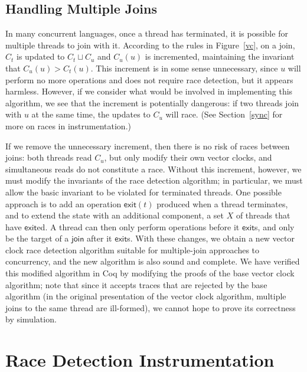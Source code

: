 \documentclass[preprint, 10pt]{sigplanconf}
\begin{document}
\subsection{Handling Multiple Joins}
\label{waits}
In many concurrent languages, once a thread has terminated, it is possible for multiple threads to join with it. According to the rules in Figure~\ref{vc}, on a join, $C_t$ is updated to $C_t \sqcup C_u$ and $C_u(u)$ is incremented, maintaining the invariant that $C_u(u) > C_t(u)$. This increment is in some sense unnecessary, since $u$ will perform no more operations and does not require race detection, but it appears harmless. However, if we consider what would be involved in implementing this algorithm, we see that the increment is potentially dangerous: if two threads join with $u$ at the same time, the updates to $C_u$ will race. (See Section~\ref{sync} for more on races in instrumentation.)

If we remove the unnecessary increment, then there is no risk of races between joins: both threads read $C_u$, but only modify their own vector clocks, and simultaneous reads do not constitute a race. Without this increment, however, we must modify the invariants of the race detection algorithm; in particular, we must allow the basic invariant to be violated for terminated threads. One possible approach is to add an operation $\mathsf{exit}(t)$ produced when a thread terminates, and to extend the state with an additional component, a set $X$ of threads that have $\mathsf{exit}$ed. A thread can then only perform operations before it $\mathsf{exit}$s, and only be the target of a $\mathsf{join}$ after it $\mathsf{exit}$s. With these changes, we obtain a new vector clock race detection algorithm suitable for multiple-join approaches to concurrency, and the new algorithm is also sound and complete. We have verified this modified algorithm in Coq by modifying the proofs of the base vector clock algorithm; note that since it accepts traces that are rejected by the base algorithm (in the original presentation of the vector clock algorithm, multiple joins to the same thread are ill-formed), we cannot hope to prove its correctness by simulation.

\section{Race Detection Instrumentation}
\label{language}
\end{document}
